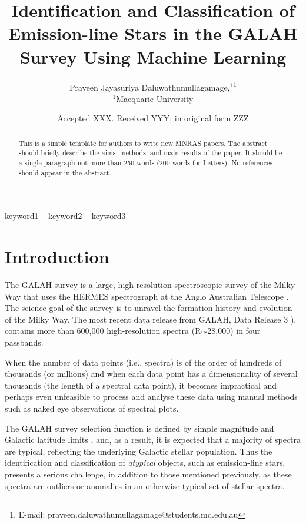 \documentclass[fleqn,usenatbib]{mnras}
\title[Short title, max. 45 characters]{Identification and Classification of
Emission-line Stars in the GALAH Survey
Using Machine Learning}
\author[P. J. Daluwathumullagamage et al.]{
Praveen Jayasuriya Daluwathumullagamage,$^{1}$\thanks{E-mail: praveen.daluwathumullagamage@students.mq.edu.au}
\\
$^{1}$Macquarie University\\
}
\date{Accepted XXX. Received YYY; in original form ZZZ}
\begin{document}
\label{firstpage}
\pagerange{\pageref{firstpage}--\pageref{lastpage}}
\maketitle

\begin{abstract}
This is a simple template for authors to write new MNRAS papers.
The abstract should briefly describe the aims, methods, and main results of the paper.
It should be a single paragraph not more than 250 words (200 words for Letters).
No references should appear in the abstract.
\end{abstract}

\begin{keywords}
keyword1 -- keyword2 -- keyword3
\end{keywords}



\section{Introduction}

The GALAH survey is a large, high resolution spectroscopic survey of the Milky Way that uses the HERMES spectrograph at the Anglo Australian Telescope \citep{de2015galah}. The science goal of the survey is to unravel the formation history and evolution of the Milky Way. The most recent data release from GALAH, Data Release 3 \citep[DR3;][]{buder2021galah+}), contains more than 600,000 high-resolution spectra (R$\sim$28,000) in four passbands. 

When the number of data points (i.e., spectra) is of the order of hundreds of thousands (or millions) and when each data point has a dimensionality of several thousands (the length of a spectral data point), it becomes impractical and perhaps even unfeasible to process and analyse these data using manual methods such as naked eye observations of spectral plots. 

The GALAH survey selection function is defined by simple magnitude and Galactic latitude limits \citep{Martell+2017}, and, as a result, it is expected that a majority of spectra are typical, reflecting the underlying Galactic stellar population. Thus the identification and classification of {\em atypical} objects, such as emission-line stars, presents a serious challenge, in addition to those mentioned previously, as these spectra are outliers or anomalies in an otherwise typical set of stellar spectra.
\end{document}
